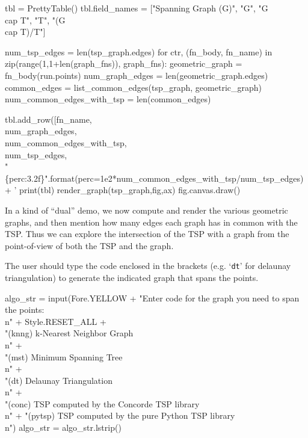 tbl             = PrettyTable()
tbl.field_names = ["Spanning Graph (G)", "G", "G \\cap T", "T", "(G \\cap T)/T"]

num_tsp_edges = len(tsp_graph.edges)
for ctr, (fn_body, fn_name) in zip(range(1,1+len(graph_fns)), graph_fns):
     geometric_graph = fn_body(run.points)
     num_graph_edges = len(geometric_graph.edges)
     common_edges    = list_common_edges(tsp_graph, geometric_graph)
     num_common_edges_with_tsp = len(common_edges)

     tbl.add_row([fn_name,                   \\
                num_graph_edges,           \\
                num_common_edges_with_tsp, \\
                num_tsp_edges,             \\
                "\{perc:3.2f\}".format(perc=1e2*num_common_edges_with_tsp/num_tsp_edges)+ ' %
print(tbl)
render_graph(tsp_graph,fig,ax)
fig.canvas.draw()
\nwendcode{}\nwdocspar

In a kind of ``dual'' demo, we now compute and render the various geometric graphs, and then mention how many 
edges each graph has in common with the TSP. Thus we can explore the intersection of the TSP with a graph
from the point-of-view of both the TSP and the graph. 

The user should type the code enclosed in the brackets (e.g. `\verb|dt|' for delaunay triangulation) to generate the 
indicated graph that spans the points. 

\nwenddocs{}\endmoddef\nwstartdeflinemarkup{}\nwenddeflinemarkup
algo_str = input(Fore.YELLOW + "Enter code for the graph you need to span the points:\\n" + Style.RESET_ALL  +\\
                     "(knng)   k-Nearest Neighbor Graph        \\n"            +\\
                     "(mst)    Minimum Spanning Tree           \\n"            +\\
                     "(dt)     Delaunay Triangulation         \\n"             +\\
                     "(conc)   TSP computed by the Concorde TSP library \\n" +
                     "(pytsp)  TSP computed by the pure Python TSP library \\n")
algo_str = algo_str.lstrip()

